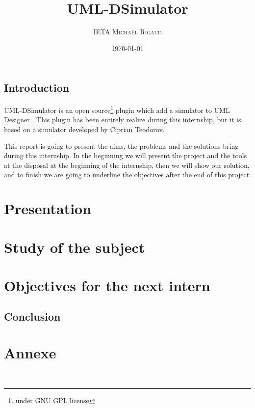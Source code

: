 \documentclass[a4paper, 11pt, oneside, oldfontcommands]{memoir}
\title{UML-DSimulator}
\author{\textsc{IETA Michaël Rigaud }}
\date{\today}
\newcounter{th}[chapter]
\newcommand{\umld}{UML Designer }
\begin{document}
\maketitle
\thispagestyle{empty}
\newpage




\tableofcontents



\chapter*{Introduction}

UML-DSimulator is an open source\footnote{under GNU GPL license} plugin which add a simulator to \umld. This plugin has been entirely realize during this internship, but it is based on a simulator developed by Ciprian Teodorov.

This report is going to present the aims, the problems and the solutions bring during this internship. In the beginning we will present the project and the tools at the disposal at the beginning of the internship, then we will show our solution, and to finish we are going to underline the objectives after the end of this project.

\newpage

\part{Presentation}






\part{Study of the subject}




\part{Objectives for the next intern}


\chapter*{Conclusion}
\newpage

\part*{Annexe}
\appendix



\nocite{*}
%
\newpage
~\\
\newpage
 \listoffigures
 \printindex
 
  
\end{document}
